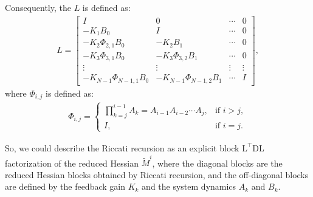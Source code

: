 \documentclass[conference]{IEEEtran}
\theoremstyle{plain}
\begin{document}
Consequently, the $L$ is defined as:
\begin{align*}
    L = 
    \begin{bmatrix}
    I & 0 & \cdots & 0 \\
    -K_1 B_0 & I & \cdots & 0 \\
    -K_2 \Phi_{2, 1} B_0 & -K_2 B_1 & \cdots & 0 \\
    -K_3 \Phi_{3, 1} B_0 & -K_3 \Phi_{3, 2} B_1 & \cdots & 0 \\
    \vdots & \vdots & \vdots &\vdots \\
    -K_{N-1} \Phi_{N-1, 1} B_0 & -K_{N-1} \Phi_{N-1, 2} B_1  & \cdots & I
    \end{bmatrix},
\end{align*}
where $\Phi_{i, j}$ is defined as:
\begin{align*}
    \Phi_{i, j} = \begin{cases}
    \prod_{k=j}^{i-1} A_k = A_{i-1} A_{i-2} \cdots A_j, & \text{if } i > j, \\
    I, & \text{if } i = j.
    \end{cases}
\end{align*}

So, we could describe the Riccati recursion as an explicit block $\mathrm{L}^\top \mathrm{DL}$ factorization of the reduced Hessian $\tilde{M}^i$,
where the diagonal blocks are the reduced Hessian blocks obtained by Riccati recursion, and the off-diagonal blocks are defined by the feedback gain $K_k$ and the system dynamics $A_k$ and $B_k$.
\end{document}
